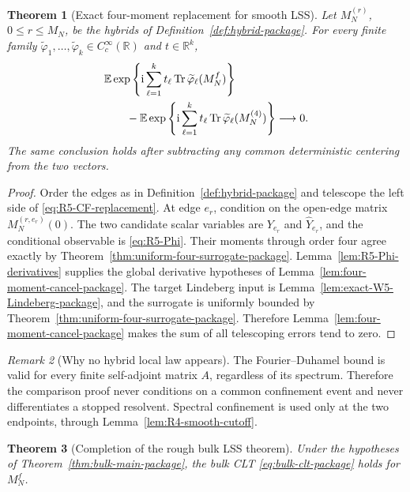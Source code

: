 \documentclass[11pt]{article}
\newtheorem{theorem}{Theorem}[section]
\theoremstyle{definition}
\theoremstyle{remark}
\newtheorem{remark}[theorem]{Remark}
\newcommand{\E}{\mathbb E}
\newcommand{\Tr}{\operatorname{Tr}}
\newcommand{\ii}{\mathrm i}
\begin{document}
\begin{theorem}[Exact four-moment replacement for smooth LSS]
\label{thm:R5-smooth-replacement}
Let \(M_N^{(r)}\), \(0\le r\le M_N\), be the hybrids of
Definition~\ref{def:hybrid-package}.  For every finite family
\(\widetilde\varphi_1,\ldots,\widetilde\varphi_k\in C_c^\infty(\mathbb R)\)
and \(t\in\mathbb R^k\),
\begin{align}
 &\E\exp\left\{\ii\sum_{\ell=1}^kt_\ell
 \Tr\widetilde\varphi_\ell(M_N^f)\right\}
 \notag\\
 &\qquad-
 \E\exp\left\{\ii\sum_{\ell=1}^kt_\ell
 \Tr\widetilde\varphi_\ell(M_N^{(4)})\right\}
 \longrightarrow0.
 \label{eq:R5-CF-replacement}
\end{align}
The same conclusion holds after subtracting any common deterministic
centering from the two vectors.
\end{theorem}

\begin{proof}
Order the edges as in Definition~\ref{def:hybrid-package} and telescope the
left side of \eqref{eq:R5-CF-replacement}.  At edge \(e_r\), condition on
the open-edge matrix \(M_N^{(r,e_r)}(0)\).  The two candidate scalar
variables are \(Y_{e_r}\) and \(\widehat Y_{e_r}\), and the conditional
observable is \eqref{eq:R5-Phi}.  Their moments through order four agree
exactly by Theorem~\ref{thm:uniform-four-surrogate-package}.
Lemma~\ref{lem:R5-Phi-derivatives} supplies the global derivative hypotheses
of Lemma~\ref{lem:four-moment-cancel-package}.  The target Lindeberg input is
Lemma~\ref{lem:exact-W5-Lindeberg-package}, and the surrogate is uniformly
bounded by Theorem~\ref{thm:uniform-four-surrogate-package}.  Therefore
Lemma~\ref{lem:four-moment-cancel-package} makes the sum of all telescoping
errors tend to zero.
\end{proof}

\begin{remark}[Why no hybrid local law appears]
The Fourier--Duhamel bound is valid for every finite self-adjoint matrix
\(A\), regardless of its spectrum.  Therefore the comparison proof never
conditions on a common confinement event and never differentiates a stopped
resolvent.  Spectral confinement is used only at the two endpoints, through
Lemma~\ref{lem:R4-smooth-cutoff}.
\end{remark}

\begin{theorem}[Completion of the rough bulk LSS theorem]
\label{thm:R5-rough-bulk}
Under the hypotheses of Theorem~\ref{thm:bulk-main-package}, the bulk CLT
\eqref{eq:bulk-clt-package} holds for \(M_N^f\).
\end{theorem}
\end{document}
